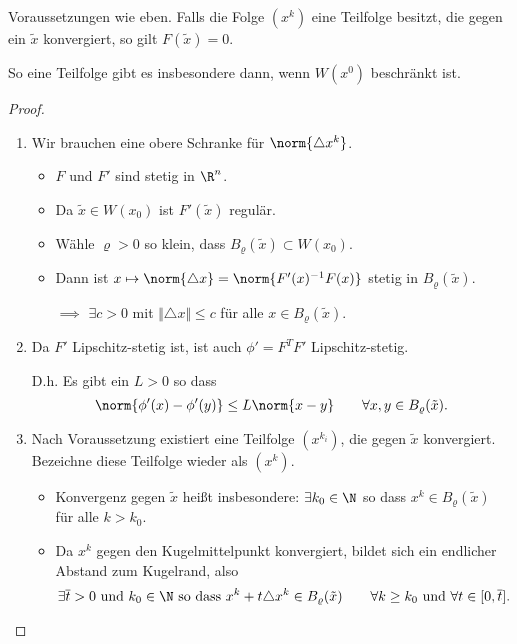 \begin{satz}
Voraussetzungen wie eben.
Falls die Folge $(x^k)$ eine Teilfolge besitzt, die gegen ein $\tilde{x}$ konvergiert, so gilt $F(\tilde{x})=0$.
\end{satz}
So eine Teilfolge gibt es insbesondere dann, wenn $W(x^0)$ beschränkt ist.
\begin{proof}
\begin{enumerate}[(1)]
 \item Wir brauchen eine obere Schranke für $\norm{\triangle x^k}$.
   \begin{itemize}
    \item $F$ und $F'$ sind stetig in $\R^n$.

    \item Da $\tilde{x} \in W(x_0)$ ist $F'(\tilde{x})$ regulär.

    \item Wähle $\varrho>0$ so klein, dass $B_{\varrho}(\tilde{x}) \subset W (x_0)$.

    \item Dann ist $x \mapsto \norm{\triangle x} = \norm{F'(x)^{-1}F(x)}$ stetig in $B_{\varrho}(\tilde{x})$.

    \item[$\implies$] $\exists c>0$ mit $\Vert \triangle x \Vert \leq c$ für alle $x \in B_{\varrho}(\tilde{x})$.
   \end{itemize}

 \item Da $F'$ Lipschitz-stetig ist, ist auch $\phi'=F^TF'$ Lipschitz-stetig.

   D.h. Es gibt ein $L>0$ so dass
  \begin{equation*}
   \norm{\phi'(x)-\phi'(y)} \leq L \norm{x-y}
   \qquad
   \forall x,y \in B_{\varrho}(\tilde{x}).
  \end{equation*}

 \item Nach Voraussetzung existiert eine Teilfolge $(x^{k_i})$, die gegen $\tilde{x}$ konvergiert.
   Bezeichne diese Teilfolge wieder als $(x^k)$.
   \begin{itemize}
    \item Konvergenz gegen $\tilde{x}$ heißt insbesondere: $\exists k_0 \in \N$ so dass $x^k \in B_{\varrho}(\tilde{x})$
      für alle $k>k_0$.

    \item Da $x^k$ gegen den Kugelmittelpunkt konvergiert, bildet sich ein endlicher Abstand zum Kugelrand, also \begin{equation*}
     \exists \overline{t}>0 \ \text{und}\ k_0 \in \N\ \text{so dass}\ x^k+t \triangle x^k \in B_{\varrho} (\tilde{x})
     \qquad
     \forall k \geq k_0\ \text{und}\ \forall t \in [0,\overline{t}].
    \end{equation*}
   \end{itemize}
\end{enumerate}


\end{proof}
